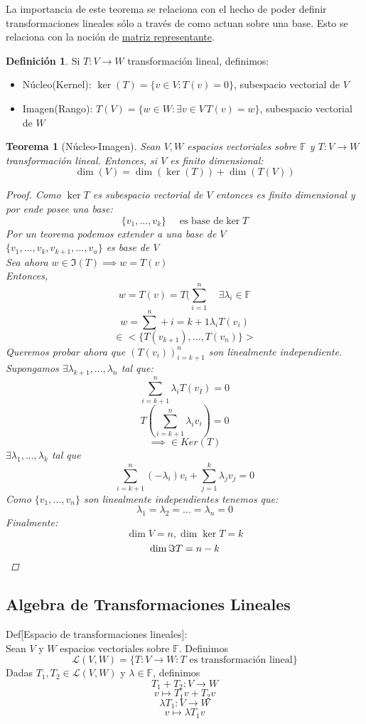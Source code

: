 \documentclass[11pt]{book}
\newtheorem{thm}{Teorema}[section]
\theoremstyle{definition}
\newtheorem{defn}{Definición}[section]
\begin{document}
La importancia de este teorema se relaciona con el hecho de poder definir transformaciones lineales sólo a través de como actuan sobre una base. Esto se relaciona con la noción de \underline{matriz representante}.
\begin{defn}
Si $T:V\rightarrow W$ transformación lineal, definimos:
\begin{itemize}
	\item Núcleo(Kernel): $\ker(T)=\{v\in V:T(v)=0\}$, subespacio vectorial de $V$
	
	\item Imagen(Rango): $T(V)=\{w\in W:\exists v\in V\, T(v)=w\}$, subespacio vectorial de $W$
\end{itemize}
\end{defn}
\begin{thm}[Núcleo-Imagen]
Sean $V,W$ espacios vectoriales sobre $\mathbb{F}$ y $T:V\rightarrow W$ transformación lineal. Entonces, si $V$ es finito dimensional:
\[
\dim(V)=\dim(\ker(T))+\dim(T(V))
\]
\begin{proof}
Como $\ker T$ es subespacio vectorial de $V$ entonces es finito dimensional y por ende posee una base:
\[
\{v_1,...,v_k\} \quad\textrm{ es base de} \ker T
\]
Por un teorema podemos extender a una base de $V$\\
$\{v_1,...,v_k,v_{k+1},...,v_u\}$ es base de $V$\\
Sea ahora $w\in\Im(T)\implies w=T(v)$\\
Entonces,
\[
w=T(v)=T(\sum^n_{i=1}\quad\exists\lambda_i\in\mathbb{F}
\]
\[
w=\sum^n+{i=k+1}\lambda_iT(v_i)
\]
\[
\in<\{T(v_{k+1}),...,T(v_n)\}>
\]
Queremos probar ahora que $(T(v_i))^n_{i=k+1}$ son linealmente independiente. Supongamos $\exists\lambda_{k+1},...,\lambda_{n}$ tal que:
\[
\sum^n_{i=k+1}\lambda_iT(v_I)=0
\]
\[
T(\sum^n_{i=k+1}\lambda_iv_i)=0
\]
\[
\implies \in Ker(T)
\]
$\exists \lambda_1,...,\lambda_k$ tal que
\[
\sum^n_{i=k+1}(-\lambda_i)v_i+\sum^k_{j=1}\lambda_jv_j=0
\]
Como $\{v_1,...,v_n\}$ son linealmente independientes tenemos que:
\[
\lambda_1=\lambda_2=...=\lambda_n=0
\]
Finalmente:
\[
\dim V=n,\dim \ker T=k
\]
\[
\dim\Im T=n-k\qedhere
\]
\end{proof}
\end{thm}
\subsection{Algebra de Transformaciones Lineales}
Def[Espacio de transformaciones lineales]:\\
Sean $V$ y $W$ espacios vectoriales sobre $\mathbb{F}$. Definimos
\[
\mathcal{L}(V,W)=\{T:V\rightarrow W:T\textrm{ es transformación lineal}\}
\]
Dadas $T_1,T_2\in\mathcal{L}(V,W)$ y $\lambda\in\mathbb{F}$, definimos
\[
T_1+T_2:V\rightarrow W
\]
\[
v\mapsto T_1v+T_2v
\]
\[
\lambda T_1:V\rightarrow W
\]
\[
v\mapsto \lambda T_1v
\]
\end{document}

